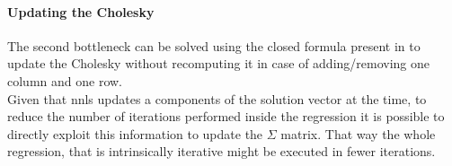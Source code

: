 \paragraph{Updating the Cholesky}
The second bottleneck can be solved using the closed formula present in \cite{wiki:Cholesky_decomposition} to update the Cholesky without recomputing it in case of adding/removing one column and one row.\\
Given that nnls updates a components of the solution vector at the time, to reduce the number of iterations performed inside the regression it is possible to directly exploit this information to update the $\Sigma$ matrix. That way the whole regression, that is intrinsically iterative might be executed in fewer iterations.\\

